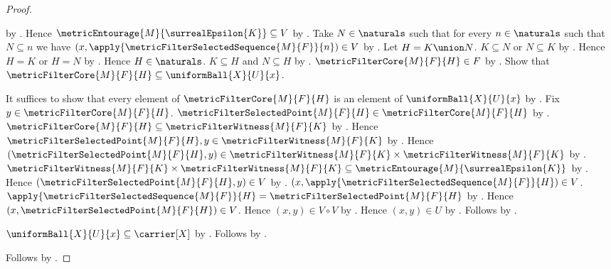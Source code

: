 \begin{proof}
\begin{subproof}
            by .
        Hence
            $\metricEntourage{M}{\surrealEpsilon{K}}\subseteq V$
            by .
        Take $N\in\naturals$ such that for every $n\in\naturals$
            such that $N\subseteq n$ we have
            $(x,\apply{\metricFilterSelectedSequence{M}{F}}{n})\in V$
            by .
        Let $H=K\union N$.
        $K\subseteq N$ or $N\subseteq K$
            by .
        Hence $H=K$ or $H=N$
            by
            .
        Hence $H\in\naturals$.
        $K\subseteq H$ and $N\subseteq H$
            by .
        $\metricFilterCore{M}{F}{H}\in F$
            by .
        Show that
            $\metricFilterCore{M}{F}{H}
                \subseteq\uniformBall{X}{U}{x}$.
        \begin{subproof}
            It suffices to show that every element of
                $\metricFilterCore{M}{F}{H}$ is an element of
                $\uniformBall{X}{U}{x}$ by .
            Fix $y\in\metricFilterCore{M}{F}{H}$.
            $\metricFilterSelectedPoint{M}{F}{H}
                \in\metricFilterCore{M}{F}{H}$
                by .
            $\metricFilterCore{M}{F}{H}
                \subseteq\metricFilterWitness{M}{F}{K}$
                by .
            Hence
                $\metricFilterSelectedPoint{M}{F}{H},y
                    \in\metricFilterWitness{M}{F}{K}$
                by .
            Hence
                $(\metricFilterSelectedPoint{M}{F}{H},y)
                    \in
                    \metricFilterWitness{M}{F}{K}
                        \times\metricFilterWitness{M}{F}{K}$
                by .
            $\metricFilterWitness{M}{F}{K}
                    \times\metricFilterWitness{M}{F}{K}
                \subseteq\metricEntourage{M}{\surrealEpsilon{K}}$
                by .
            Hence $(\metricFilterSelectedPoint{M}{F}{H},y)\in V$
                by .
            $(x,\apply{\metricFilterSelectedSequence{M}{F}}{H})\in V$.
            $\apply{\metricFilterSelectedSequence{M}{F}}{H}
                =\metricFilterSelectedPoint{M}{F}{H}$
                by .
            Hence $(x,\metricFilterSelectedPoint{M}{F}{H})\in V$.
            Hence $(x,y)\in V\circ V$ by .
            Hence $(x,y)\in U$ by .
            Follows by .
        \end{subproof}
        $\uniformBall{X}{U}{x}\subseteq\carrier[X]$
            by .
        Follows by .
    \end{subproof}
    Follows by .
\end{proof}

